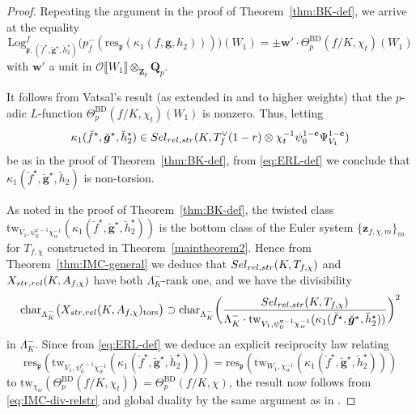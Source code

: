 \documentclass[10pt,letterpaper]{amsart}
\theoremstyle{plain}
\theoremstyle{definition}
\theoremstyle{definition}
\theoremstyle{plain}
\theoremstyle{plain}
\theoremstyle{plain}
\theoremstyle{remark}
\numberwithin{equation}{section}
\newcommand{\cc}{\mathbf{c}}
\newcommand{\Sel}{Sel}
\newcommand{\pp}{\mathfrak{p}}
\newcommand{\relstr}{{{\rm rel},{\rm str}}}
\newcommand{\strrel}{{{\rm str},{\rm rel}}}
\DeclareMathOperator{\BD}{BD} %
\def\cO{\mathcal O}
\newcommand{\Q}{\mathbf{Q}}
\newcommand{\Z}{\mathbf{Z}}
\def\Sel{{\rm Sel}}
\newcommand{\dBr}[1]{\llbracket{#1}\rrbracket}
\newcommand{\bfg}{{\boldsymbol{g}}}
\begin{document}
\begin{proof}
Repeating the argument in the proof of Theorem~\ref{thm:BK-def}, we arrive at the equality
\begin{equation}\label{eq:ERL-def}
{\mathrm{Log}}^f_{\pp,(\breve{f}^\star,\breve{\bfg}^\star,\breve{h}_2^\star)}\bigl(p_f^-({\mathrm{res}}_\pp(\kappa_1(f,\bfg,h_2)))\bigr)(W_1)=\pm\mathbf{w}'\cdot\Theta_p^{\BD}(f/K,\chi_t)(W_1)
\end{equation}
with $\mathbf{w}'$ a unit in $\cO\dBr{W_1}\otimes_{\Z_p}\Q_p$. 

It follows from Vatsal's result \cite[Thm.~1.1]{vatsal-special} (as extended   
in \cite[Thm.~C]{ChHs1} and \cite[Thm.~B]{hung} to higher weights) that the $p$-adic $L$-function $\Theta_p^{\BD}(f/K,\chi_t)(W_1)$ is nonzero. Thus, letting 
\[
\kappa_1(\breve{f}^\star,\breve{\bfg}^\star,\breve{h}_2^\star)\in\Sel_{\relstr}(K,T_f^{\vee}(1-r)\otimes\chi_t^{-1}\psi_0^{1-\cc}\Psi_{V_1}^{1-\cc}) 
\]
be as in the proof of Theorem~\ref{thm:BK-def}, from \eqref{eq:ERL-def} 
 we conclude that $\kappa_1(\breve{f}^\star,\breve{\bfg}^\star,\breve{h}_2)$ is non-torsion. 

As noted in the proof of Theorem~\ref{thm:BK-def}, the twisted class ${\mathrm{tw}}_{V_1,\psi_0^{\cc-1}\chi_w^{-1}}(\kappa_1(\breve{f}^\star,\breve{\bfg}^\star,\breve{h}_2^\star))$ is the bottom class of the Euler system $\{\mathbf{z}_{f,\chi,m}\}_m$ for $T_{f,\chi}$ constructed in Theorem~\ref{maintheorem2}. 
Hence from Theorem~\ref{thm:IMC-general} we deduce that $\Sel_{\relstr}(K,T_{f,\chi})$ and $X_{\strrel}(K,A_{f,\chi})$ have both $\Lambda_K^-$-rank one, and we have the divisibility
\begin{equation}\label{eq:IMC-div-relstr}
{\mathrm{char}}_{\Lambda_{K}^-}\bigl(X_{\strrel}(K,A_{f,\chi})_{\mathrm{tors}}\bigr)\supset{\mathrm{char}}_{\Lambda_K^-}\biggl(\frac{\Sel_{\relstr}(K,T_{f,\chi})}{\Lambda_K^-\cdot{\mathrm{tw}}_{V_1,\psi_0^{\cc-1}\chi_w^{-1}}(\kappa_1(\breve{f}^\star,\breve{\bfg}^\star,\breve{h}_2^\star))}\biggr)^2
\end{equation}
in $\Lambda_K^-$. Since from \eqref{eq:ERL-def} we deduce an explicit reciprocity law relating 
\[
{\mathrm{res}}_\pp({\mathrm{tw}}_{V_1,\psi_0^{\cc-1}\chi_w^{-1}}(\kappa_1(\breve{f}^\star,\breve{\bfg}^\star,\breve{h}_2^\star)))=
{\mathrm{res}}_\pp({\mathrm{tw}}_{W_1,\chi_w^{-1}}(\kappa_1(\breve{f}^\star,\breve{\bfg}^\star,\breve{h}_2^\star)))
\]
to ${\mathrm{tw}}_{\chi_w}(\Theta_p^{\BD}(f/K,\chi_t))=\Theta_p^{\BD}(f/K,\chi)$, the result now follows from \eqref{eq:IMC-div-relstr} and global duality by the same argument as in \cite[Thm.~5.1]{BCK-PRconj}.
\end{proof}
\end{document}
